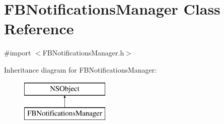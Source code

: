 \hypertarget{interface_f_b_notifications_manager}{}\section{F\+B\+Notifications\+Manager Class Reference}
\label{interface_f_b_notifications_manager}


{\ttfamily \#import $<$F\+B\+Notifications\+Manager.\+h$>$}

Inheritance diagram for F\+B\+Notifications\+Manager\+:\begin{figure}[H]
\begin{center}
\leavevmode
\includegraphics[height=2.000000cm]{interface_f_b_notifications_manager}
\end{center}
\end{figure}
